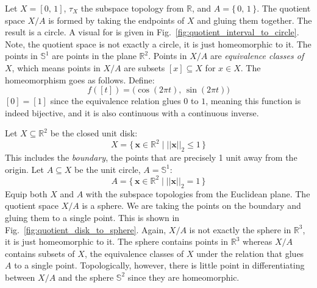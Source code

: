 \documentclass{article}
\theoremstyle{plain}
\theoremstyle{normal}
\newenvironment{example}{%
    \pushQED{\qed}\renewcommand{\qedsymbol}{$\blacksquare$}\examplex%
}{%
    \popQED\endexamplex%
}
\begin{document}
        \begin{example}
            Let $X=[0,\,1]$, $\tau_{X}$ the subspace topology from $\mathbb{R}$,
            and $A=\{\,0,\,1\,\}$. The quotient space $X/A$ is formed by taking
            the endpoints of $X$ and gluing them together. The result is a
            circle. A visual for is given in
            Fig.~\ref{fig:quotient_interval_to_circle}. Note, the quotient space
            is not exactly a circle, it is just homeomorphic to it. The points
            in $\mathbb{S}^{1}$ are points in the plane $\mathbb{R}^{2}$. Points
            in $X/A$ are \textit{equivalence classes of} $X$, which means points
            in $X/A$ are subsets $[x]\subseteq{X}$ for $x\in{X}$. The
            homeomorphism goes as follows. Define:
            \begin{equation}
                f([t])=\big(\cos(2\pi{t}),\,\sin(2\pi{t})\big)
            \end{equation}
            $[0]=[1]$ since the equivalence relation glues $0$ to $1$, meaning
            this function is indeed bijective, and it is also continuous with
            a continuous inverse.
        \end{example}
        \begin{example}
            Let $X\subseteq\mathbb{R}^{2}$ be the closed unit disk:
            \begin{equation}
                X=\{\,\mathbf{x}\in\mathbb{R}^{2}\;|\;
                    ||\mathbf{x}||_{2}\leq{1}\,\}
            \end{equation}
            This includes the \textit{boundary}, the points that are precisely
            1 unit away from the origin. Let $A\subseteq{X}$ be the unit
            circle, $A=\mathbb{S}^{1}$:
            \begin{equation}
                A=\{\,\mathbf{x}\in\mathbb{R}^{2}\;|\;
                    ||\mathbf{x}||_{2}=1\,\}
            \end{equation}
            Equip both $X$ and $A$ with the subspace topologies from the
            Euclidean plane. The quotient space $X/A$ is a sphere. We are
            taking the points on the boundary and gluing them to a single point.
            This is shown in Fig.~\ref{fig:quotient_disk_to_sphere}. Again,
            $X/A$ is not exactly the sphere in $\mathbb{R}^{3}$, it is just
            homeomorphic to it. The sphere contains points in $\mathbb{R}^{3}$
            whereas $X/A$ contains subsets of $X$, the equivalence classes of
            $X$ under the relation that glues $A$ to a single point.
            Topologically, however, there is little point in differentiating
            between $X/A$ and the sphere $\mathbb{S}^{2}$ since they are
            homeomorphic.
        \end{example}
\end{document}

